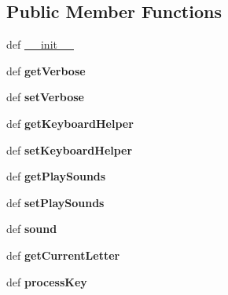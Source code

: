 \subsection*{Public Member Functions}
\begin{DoxyCompactItemize}
\item 
def \hyperlink{classmain_1_1_main_frame_a03cf7833edb9fa538844710f9ff5a8aa}{\+\_\+\+\_\+init\+\_\+\+\_\+}
\item 
\hypertarget{classmain_1_1_main_frame_aa9bd704144c614aaf4586d2cd2b3d8be}{def {\bfseries get\+Verbose}}\label{classmain_1_1_main_frame_aa9bd704144c614aaf4586d2cd2b3d8be}

\item 
\hypertarget{classmain_1_1_main_frame_a0f583715f1e4d919e1868d9df38c3d83}{def {\bfseries set\+Verbose}}\label{classmain_1_1_main_frame_a0f583715f1e4d919e1868d9df38c3d83}

\item 
\hypertarget{classmain_1_1_main_frame_a2df2d8c821da4aa4c52c7534e824d69b}{def {\bfseries get\+Keyboard\+Helper}}\label{classmain_1_1_main_frame_a2df2d8c821da4aa4c52c7534e824d69b}

\item 
\hypertarget{classmain_1_1_main_frame_ad6840582e953002cb0ab94fec037fc32}{def {\bfseries set\+Keyboard\+Helper}}\label{classmain_1_1_main_frame_ad6840582e953002cb0ab94fec037fc32}

\item 
\hypertarget{classmain_1_1_main_frame_a2b7bb3f0041af126d27f58c41e7239ac}{def {\bfseries get\+Play\+Sounds}}\label{classmain_1_1_main_frame_a2b7bb3f0041af126d27f58c41e7239ac}

\item 
\hypertarget{classmain_1_1_main_frame_abf041b8e926dd9fa0a522463d5000de3}{def {\bfseries set\+Play\+Sounds}}\label{classmain_1_1_main_frame_abf041b8e926dd9fa0a522463d5000de3}

\item 
\hypertarget{classmain_1_1_main_frame_acafee3190e194ab1b585e77dcacc2072}{def {\bfseries sound}}\label{classmain_1_1_main_frame_acafee3190e194ab1b585e77dcacc2072}

\item 
\hypertarget{classmain_1_1_main_frame_a6b700a95a83900eea614f2b3837e1259}{def {\bfseries get\+Current\+Letter}}\label{classmain_1_1_main_frame_a6b700a95a83900eea614f2b3837e1259}

\item 
\hypertarget{classmain_1_1_main_frame_a9eaf9c8f88f50ecddcf57d873de6f903}{def {\bfseries process\+Key}}\label{classmain_1_1_main_frame_a9eaf9c8f88f50ecddcf57d873de6f903}


\end{DoxyCompactItemize}
